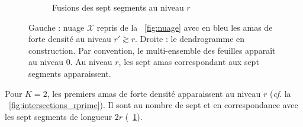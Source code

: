 \begin{figure}[htbp]
\begin{subfigure}[b]{0.53\textwidth}
        \caption{Fusions des sept segments au niveau $r$}
        \label{fig:foret_dendrogrammes}
    \end{subfigure}
    
    \caption{Gauche : nuage $\mathcal X$ repris de la \Fig~\ref{fig:nuage} avec en bleu les amas de forte densité au niveau $r' \gtrsim r$. Droite : le dendrogramme en construction. Par convention, le multi-ensemble des feuilles apparaît au niveau $0$. Au niveau $r$, les sept amas correspondant aux sept segments apparaissent.}
    \label{fig:complexe_rprime}
\end{figure}


Pour $K=2$, les premiers amas de forte densité apparaissent au niveau $r$ (\emph{cf}. la \Fig~\ref{fig:intersections_rprime}). Il sont au nombre de sept et en correspondance avec les sept segments de longueur $2r$ (\Fig~\ref{fig:foret_dendrogrammes}).


